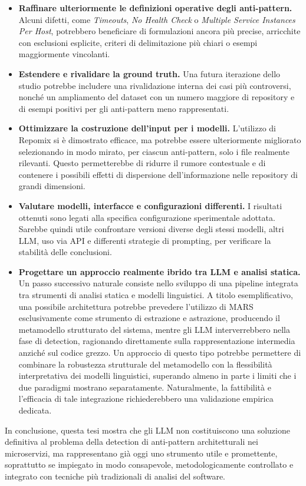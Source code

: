 \begin{itemize}
    \item \textbf{Raffinare ulteriormente le definizioni operative degli anti-pattern.}  
    Alcuni difetti, come \textit{Timeouts}, \textit{No Health Check} o \textit{Multiple Service Instances Per Host}, potrebbero beneficiare di formulazioni ancora più precise, arricchite con esclusioni esplicite, criteri di delimitazione più chiari o esempi maggiormente vincolanti.

    \item \textbf{Estendere e rivalidare la ground truth.}  
    Una futura iterazione dello studio potrebbe includere una rivalidazione interna dei casi più controversi, nonché un ampliamento del dataset con un numero maggiore di repository e di esempi positivi per gli anti-pattern meno rappresentati.

    \item \textbf{Ottimizzare la costruzione dell’input per i modelli.}  
    L’utilizzo di Repomix si è dimostrato efficace, ma potrebbe essere ulteriormente migliorato selezionando in modo mirato, per ciascun anti-pattern, solo i file realmente rilevanti. Questo permetterebbe di ridurre il rumore contestuale e di contenere i possibili effetti di dispersione dell’informazione nelle repository di grandi dimensioni.

    \item \textbf{Valutare modelli, interfacce e configurazioni differenti.}  
    I risultati ottenuti sono legati alla specifica configurazione sperimentale adottata. Sarebbe quindi utile confrontare versioni diverse degli stessi modelli, altri LLM, uso via API e differenti strategie di prompting, per verificare la stabilità delle conclusioni.

    \item \textbf{Progettare un approccio realmente ibrido tra LLM e analisi statica.}  
    Un passo successivo naturale consiste nello sviluppo di una pipeline integrata tra strumenti di analisi statica e modelli linguistici. A titolo esemplificativo, una possibile architettura potrebbe prevedere l’utilizzo di MARS esclusivamente come strumento di estrazione e astrazione, producendo il metamodello strutturato del sistema, mentre gli LLM interverrebbero nella fase di detection, ragionando direttamente sulla rappresentazione intermedia anziché sul codice grezzo. Un approccio di questo tipo potrebbe permettere di combinare la robustezza strutturale del metamodello con la flessibilità interpretativa dei modelli linguistici, superando almeno in parte i limiti che i due paradigmi mostrano separatamente. Naturalmente, la fattibilità e l’efficacia di tale integrazione richiederebbero una validazione empirica dedicata.
\end{itemize}

In conclusione, questa tesi mostra che gli LLM non costituiscono una soluzione definitiva al problema della detection di anti-pattern architetturali nei microservizi, ma rappresentano già oggi uno strumento utile e promettente, soprattutto se impiegato in modo consapevole, metodologicamente controllato e integrato con tecniche più tradizionali di analisi del software.


